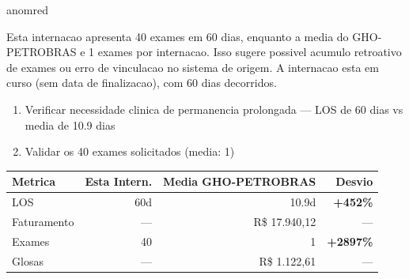 \documentclass[a4paper,10pt]{article}
\begin{document}
\begin{anomalycard}[Internacao 162889 | GHO-PETROBRAS | CRITICO (z=5.17)]{anomred}
\vspace{2pt}\begin{tcolorbox}[colback=severityred!20,colframe=anomred,title={\textbf{Interpretacao de Negocio}},fonttitle=\bfseries\small,left=4pt,right=4pt,top=3pt,bottom=3pt]
{\small Esta internacao apresenta 40 exames em 60 dias, enquanto a media do GHO-PETROBRAS e 1 exames por internacao. Isso sugere possivel acumulo retroativo de exames ou erro de vinculacao no sistema de origem. A internacao esta em curso (sem data de finalizacao), com 60 dias decorridos.}
\end{tcolorbox}
\begin{tcolorbox}[colback=severityyellow!30,colframe=anomorange,title={\textbf{Recomendacoes Especificas}},fonttitle=\bfseries\small,left=4pt,right=4pt,top=3pt,bottom=3pt]
\begin{enumerate}[nosep,leftmargin=16pt]
\item {\small Verificar necessidade clinica de permanencia prolongada --- LOS de 60 dias vs media de 10.9 dias}
\item {\small Validar os 40 exames solicitados (media: 1)}
\end{enumerate}
\end{tcolorbox}
\begin{center}\begin{tabular}{l r r r}\toprule\textbf{Metrica} & \textbf{Esta Intern.} & \textbf{Media GHO-PETROBRAS} & \textbf{Desvio} \\\midrule
LOS & 60d & 10.9d & \textcolor{anomred}{\textbf{+452\%}} \\
Faturamento & --- & R\$ 17.940,12 & --- \\
Exames & 40 & 1 & \textcolor{anomred}{\textbf{+2897\%}} \\
Glosas & --- & R\$ 1.122,61 & --- \\
\bottomrule\end{tabular}\end{center}


\end{anomalycard}
\end{document}
